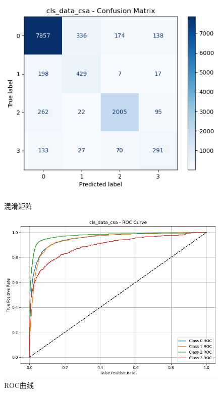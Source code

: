 \documentclass[10pt]{article}
\begin{document}
\begin{figure}[H]
\centering
\begin{minipage}[t]{0.45\textwidth}
  \centering
  \includegraphics[width=\linewidth]{cls_lda_sca1.png}
  \caption{混淆矩阵}
  \label{fig:45}
\end{minipage}
\hfill
\begin{minipage}[t]{0.52\textwidth}
  \centering
  \includegraphics[width=\linewidth]{cls_lda_sca2.png}
  \caption{ROC曲线}
  \label{fig:46}
\end{minipage}
\end{figure}
\end{document}
